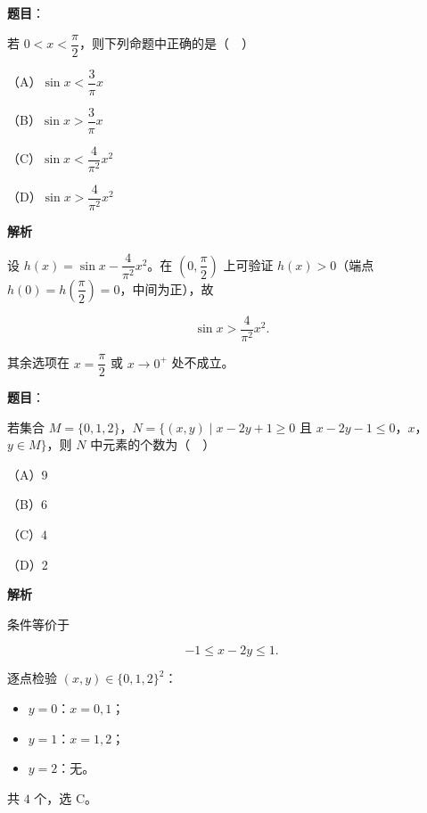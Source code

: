 \begin{answer}

\textbf{题目}：

若 $0<x<\dfrac{\pi}{2}$，则下列命题中正确的是（　）

（A）$\sin x<\dfrac3\pi x$

（B）$\sin x>\dfrac3\pi x$

（C）$\sin x<\dfrac4{\pi^2}x^2$

（D）$\sin x>\dfrac4{\pi^2}x^2$

\textbf{解析}

设 $h(x)=\sin x-\dfrac4{\pi^2}x^2$。在 $\left(0,\dfrac{\pi}{2}\right)$ 上可验证 $h(x)>0$（端点 $h(0)=h\left(\dfrac{\pi}{2}\right)=0$，中间为正），故

\nopagebreak[4]
\[\sin x>\frac4{\pi^2}x^2.\]

其余选项在 $x=\dfrac{\pi}{2}$ 或 $x\to0^+$ 处不成立。


\end{answer}
\begin{answer}

\textbf{题目}：

若集合 $M=\{0,1,2\}$，$N=\{(x,y)\mid x-2y+1\geqslant0$ 且 $x-2y-1\leqslant0$，$x$，$y\in M\}$，则 $N$ 中元素的个数为（　）

（A）$9$

（B）$6$

（C）$4$

（D）$2$

\textbf{解析}

条件等价于

\nopagebreak[4]
\[-1\leqslant x-2y\leqslant1.\]

逐点检验 $(x,y)\in\{0,1,2\}^2$：

\begin{itemize}
\item $y=0$：$x=0,1$；
\item $y=1$：$x=1,2$；
\item $y=2$：无。
\end{itemize}

共 $4$ 个，选 C。


\end{answer}
